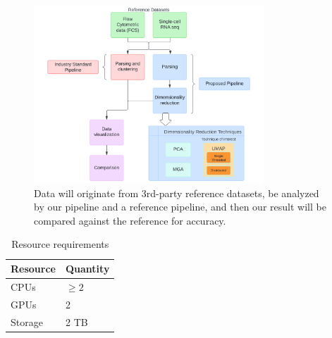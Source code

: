 \documentclass[11pt,letterpaper]{article}
\begin{document}
\begin{figure}[h]
  \begin{minipage}[b]{0.45\linewidth}
  \centering
    \includegraphics[width=3.4in]{whpc_data_diagram}
    \caption{Data will originate from 3rd-party reference datasets, be analyzed by our pipeline and a reference pipeline, and then our result will be compared against the reference for accuracy.}
    \label{fig:datadiagram}
  \end{minipage}
\end{figure}

\begin{table}[h]
  \begin{minipage}[b]{0.48\linewidth}
  \centering
  \begin{tabular}[l]{|l l|}
  \hline
  Resource & Quantity \\
  \hline
  CPUs & $\geq 2$ \\
  GPUs & 2 \\
  Storage & 2 TB \\
  \hline
\end{tabular}\\
\caption{Resource requirements}
\label{table:resources}
\end{minipage}
\end{table}


\newgeometry{}
\printbibliography
\end{document}
